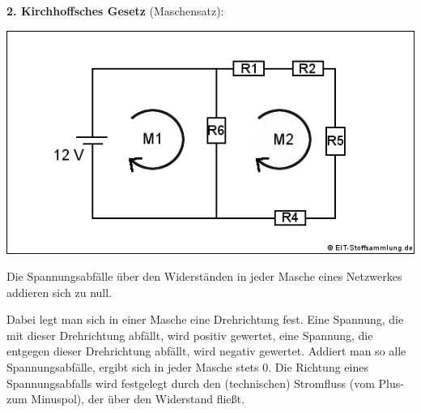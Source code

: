 \begin{sich}
\textbf{2. Kirchhoffsches Gesetz} (Maschensatz):

\begin{center}
\includegraphics[scale=.8]{pics/maschensatz}
\label{Abb:Maschensatz}
\end{center}

Die Spannungsabfälle über den Widerständen in jeder Masche eines Netzwerkes addieren sich zu null.
\end{sich}

Dabei legt man sich in einer Masche eine Drehrichtung fest.
Eine Spannung, die mit dieser Drehrichtung abfällt, wird positiv gewertet,
eine Spannung, die entgegen dieser Drehrichtung abfällt, wird negativ gewertet.
Addiert man so alle Spannungsabfälle, ergibt sich in jeder Masche stets 0.
Die Richtung eines Spannungsabfalls wird festgelegt durch den (technischen) Stromfluss (vom Plus- zum Minuspol), der über den Widerstand fließt.


